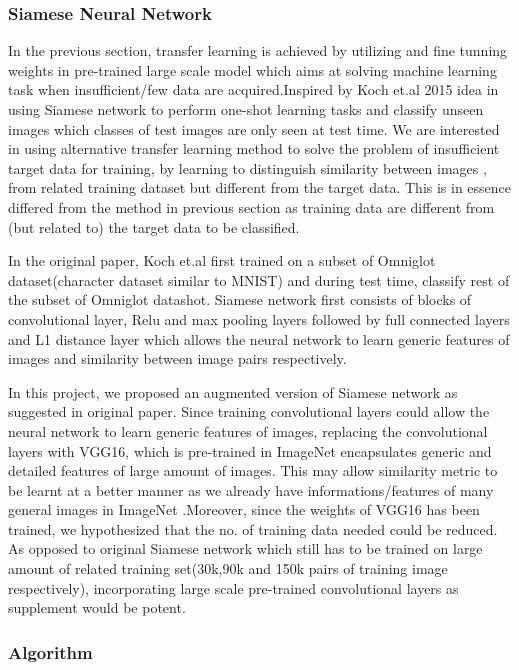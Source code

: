 \documentclass{article}
\begin{document}
\subsubsection{\textbf{Siamese Neural Network}}

In the previous section, transfer learning is achieved by utilizing and fine tunning weights in pre-trained large scale model which aims at solving machine learning task when insufficient/few data are acquired.Inspired by Koch et.al 2015 idea in using Siamese network to perform one-shot learning tasks and classify unseen images which classes of test images are only seen at test time. We are interested in using alternative transfer learning method to solve the problem of insufficient target data for training, by learning to distinguish similarity between images , from related training dataset but different from the target data. This is in essence differed from the method in previous section as training data are different from (but related to) the target data to be classified. 

In the original paper, Koch et.al first trained on a subset of Omniglot dataset(character dataset similar to MNIST) and during test time, classify rest of the subset of Omniglot datashot. Siamese network first consists of blocks of convolutional layer, Relu and max pooling layers followed by full connected layers and L1 distance layer which allows the neural network to learn generic features of images and similarity between image pairs respectively. 

In this project, we proposed an augmented version of Siamese network as suggested in original paper. Since training convolutional layers could allow the neural network to learn generic features of images, replacing the convolutional layers with VGG16, which is pre-trained in ImageNet encapsulates generic and detailed features of large amount of images. This may allow similarity metric to be learnt at a better manner as we already have informations/features of many general images in ImageNet .Moreover, since the weights of VGG16 has been trained, we hypothesized that the no. of training data needed could be reduced. As opposed to original Siamese network which still has to be trained on large amount of related training set(30k,90k and 150k pairs of training image respectively), incorporating large scale pre-trained convolutional layers as supplement would be potent.

\subsubsection{\textbf{Algorithm}}
\end{document}
